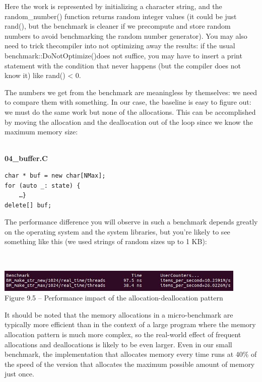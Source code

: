 Here the work is represented by initializing a character string, and the random\_number() function returns random integer values (it could be just rand(), but the benchmark is cleaner if we precompute and store random numbers to avoid benchmarking the random number generator). You may also need to trick thecompiler into not optimizing away the results: if the usual benchmark::DoNotOptimize()does not suffice, you may have to insert a print statement with the condition that never happens (but the compiler does not know it) like rand() < 0.

The numbers we get from the benchmark are meaningless by themselves: we need to compare them with something. In our case, the baseline is easy to figure out: we must do the same work but none of the allocations. This can be accomplished by moving the allocation and the deallocation out of the loop since we know the maximum memory size:

\hspace*{\fill} \\ %
\noindent
\textbf{04\_buffer.C}
\begin{lstlisting}[style=styleCXX]
char * buf = new char[NMax];
for (auto _: state) {
	…}
delete[] buf;
\end{lstlisting}

The performance difference you will observe in such a benchmark depends greatly on the operating system and the system libraries, but you’re likely to see something like this (we used strings of random sizes up to 1 KB):

\hspace*{\fill} \\ %
\begin{center}
\includegraphics[width=0.9\textwidth]{content/3/chapter9/images/5.jpg}\\
Figure 9.5 – Performance impact of the allocation-deallocation pattern
\end{center}

It should be noted that the memory allocations in a micro-benchmark are typically more efficient than in the context of a large program where the memory allocation pattern is much more complex, so the real-world effect of frequent allocations and deallocations is likely to be even larger. Even in our small benchmark, the implementation that allocates memory every time runs at 40\% of the speed of the version that allocates the maximum possible amount of memory just once. 

